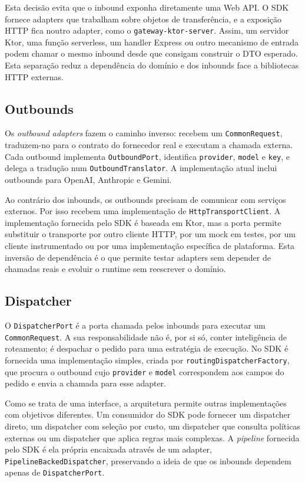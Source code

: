 \documentclass[11pt,a4paper]{report}
\begin{document}
    Esta decisão evita que o inbound exponha diretamente uma Web API. O SDK fornece adapters que trabalham sobre objetos de transferência, e a exposição HTTP fica noutro adapter, como o \texttt{gateway-ktor-server}. Assim, um servidor Ktor, uma função serverless, um handler Express ou outro mecanismo de entrada podem chamar o mesmo inbound desde que consigam construir o DTO esperado. Esta separação reduz a dependência do domínio e dos inbounds face a bibliotecas HTTP externas.

    \subsection{Outbounds}
    Os \textit{outbound adapters} fazem o caminho inverso: recebem um \texttt{CommonRequest}, traduzem-no para o contrato do fornecedor real e executam a chamada externa. Cada outbound implementa \texttt{OutboundPort}, identifica \texttt{provider}, \texttt{model} e \texttt{key}, e delega a tradução num \texttt{OutboundTranslator}. A implementação atual inclui outbounds para OpenAI, Anthropic e Gemini.

    Ao contrário dos inbounds, os outbounds precisam de comunicar com serviços externos. Por isso recebem uma implementação de \texttt{HttpTransportClient}. A implementação fornecida pelo SDK é baseada em Ktor, mas a porta permite substituir o transporte por outro cliente HTTP, por um mock em testes, por um cliente instrumentado ou por uma implementação específica de plataforma. Esta inversão de dependência é o que permite testar adapters sem depender de chamadas reais e evoluir o runtime sem reescrever o domínio.

    \subsection{Dispatcher}
    O \texttt{DispatcherPort} é a porta chamada pelos inbounds para executar um \texttt{CommonRequest}. A sua responsabilidade não é, por si só, conter inteligência de roteamento; é despachar o pedido para uma estratégia de execução. No SDK é fornecida uma implementação simples, criada por \texttt{routingDispatcherFactory}, que procura o outbound cujo \texttt{provider} e \texttt{model} correspondem aos campos do pedido e envia a chamada para esse adapter.

    Como se trata de uma interface, a arquitetura permite outras implementações com objetivos diferentes. Um consumidor do SDK pode fornecer um dispatcher direto, um dispatcher com seleção por custo, um dispatcher que consulta políticas externas ou um dispatcher que aplica regras mais complexas. A \textit{pipeline} fornecida pelo SDK é ela própria encaixada através de um adapter, \texttt{PipelineBackedDispatcher}, preservando a ideia de que os inbounds dependem apenas de \texttt{DispatcherPort}.
\end{document}

